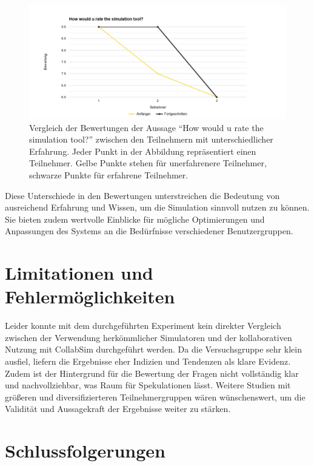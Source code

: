 \documentclass[german,version-2020-11]{uzl-thesis}
\begin{document}
  \begin{figure}[htpb]
    \centering
    \includegraphics[scale=0.4]{figures/group6.png}
    \caption{Vergleich der Bewertungen der Aussage ``How would u rate the simulation tool?'' zwischen den Teilnehmern mit unterschiedlicher Erfahrung. 
              Jeder Punkt in der Abbildung repräsentiert einen Teilnehmer. Gelbe Punkte stehen für unerfahrenere Teilnehmer, schwarze Punkte für erfahrene Teilnehmer. }
    \label{fig-group6}
  \end{figure}

  Diese Unterschiede in den Bewertungen unterstreichen die Bedeutung von ausreichend Erfahrung und Wissen, um die Simulation sinnvoll nutzen zu können. 
  Sie bieten zudem wertvolle Einblicke für mögliche Optimierungen und Anpassungen des Systems an die Bedürfnisse verschiedener Benutzergruppen.





\section{Limitationen und Fehlermöglichkeiten}
  Leider konnte mit dem durchgeführten Experiment kein direkter Vergleich zwischen der Verwendung herkömmlicher Simulatoren und der kollaborativen Nutzung mit CollabSim durchgeführt werden. 
  Da die Versuchsgruppe sehr klein ausfiel, liefern die Ergebnisse eher Indizien und Tendenzen als klare Evidenz. 
  Zudem ist der Hintergrund für die Bewertung der Fragen nicht vollständig klar und nachvollziehbar, was Raum für Spekulationen lässt. 
  Weitere Studien mit größeren und diversifizierteren Teilnehmergruppen wären wünschenswert, um die Validität und Aussagekraft der Ergebnisse weiter zu stärken.

\section{Schlussfolgerungen}
\end{document}
